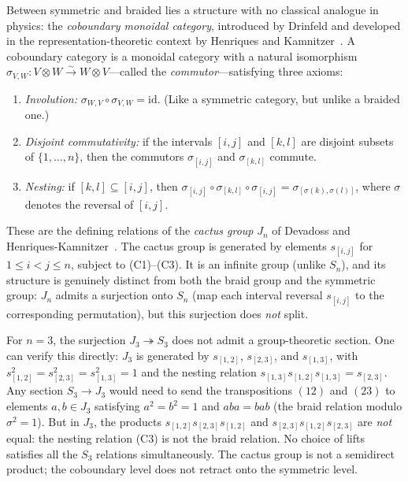 Between symmetric and braided lies a structure with no classical
analogue in physics: the \emph{coboundary monoidal category},
introduced by Drinfeld and developed in the representation-theoretic
context by Henriques and
Kamnitzer~\cite{henriques-kamnitzer-2006}.  A coboundary category
is a monoidal category with a natural isomorphism $\sigma_{V,W} \colon
V \otimes W \xrightarrow{\sim} W \otimes V$---called the
\emph{commutor}---satisfying three axioms:
\begin{enumerate}
\item[(C1)] \emph{Involution:} $\sigma_{W,V} \circ \sigma_{V,W} =
  \mathrm{id}$.  (Like a symmetric category, but unlike a braided one.)
\item[(C2)] \emph{Disjoint commutativity:} if the intervals $[i,j]$
  and $[k,l]$ are disjoint subsets of $\{1, \ldots, n\}$, then the
  commutors $\sigma_{[i,j]}$ and $\sigma_{[k,l]}$ commute.
\item[(C3)] \emph{Nesting:} if $[k,l] \subseteq [i,j]$, then
  $\sigma_{[i,j]} \circ \sigma_{[k,l]} \circ \sigma_{[i,j]} =
  \sigma_{[\sigma(k), \sigma(l)]}$, where $\sigma$ denotes the
  reversal of $[i,j]$.
\end{enumerate}
These are the defining relations of the \emph{cactus group} $J_n$
of Devadoss and
Henriques-Kamnitzer~\cite{henriques-kamnitzer-2006}.  The cactus
group is generated by elements $s_{[i,j]}$ for $1 \leq i < j \leq n$,
subject to (C1)--(C3).  It is an infinite group (unlike $S_n$), and
its structure is genuinely distinct from both the braid group and the
symmetric group: $J_n$ admits a surjection onto $S_n$ (map each
interval reversal $s_{[i,j]}$ to the corresponding permutation), but
this surjection does \emph{not} split.

\begin{remark}
\label{rem:cactus-nonsplit}
For $n = 3$, the surjection $J_3 \twoheadrightarrow S_3$ does not
admit a group-theoretic section.  One can verify this directly: $J_3$
is generated by $s_{[1,2]}$, $s_{[2,3]}$, and $s_{[1,3]}$, with
$s_{[1,2]}^2 = s_{[2,3]}^2 = s_{[1,3]}^2 = 1$ and the nesting
relation $s_{[1,3]} s_{[1,2]} s_{[1,3]} = s_{[2,3]}$.  Any section
$S_3 \to J_3$ would need to send the transpositions $(12)$ and $(23)$
to elements $a, b \in J_3$ satisfying $a^2 = b^2 = 1$ and
$aba = bab$ (the braid relation modulo $\sigma^2 = 1$).  But in $J_3$,
the products $s_{[1,2]} s_{[2,3]} s_{[1,2]}$ and
$s_{[2,3]} s_{[1,2]} s_{[2,3]}$ are \emph{not} equal: the nesting
relation (C3) is not the braid relation.  No choice of lifts
satisfies all the $S_3$ relations simultaneously.  The cactus group
is not a semidirect product; the coboundary level does not retract
onto the symmetric level.
\end{remark}

